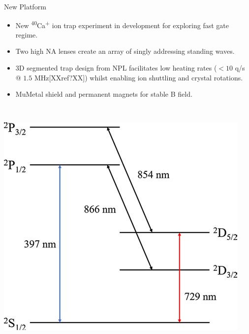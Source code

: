 \documentclass[final]{beamer}
\begin{document}
\begin{frame}{}
\begin{center}
\begin{columns}[t]
\begin{column}{0.49\textwidth}
    \begin{alertblock}{New Platform}
      \begin{minipage}{0.58\textwidth}
      \begin{itemize}
      \item New \textsuperscript{40}Ca\textsuperscript{+} ion trap experiment in development for exploring fast
        gate regime.
      \item Two high NA lenses create an array of singly
        addressing standing waves.
      \item 3D segmented trap design from NPL facilitates low heating
        rates ($<10$ q/s @ $1.5$ MHz[XXref?XX]) whilst enabling ion shuttling and crystal rotations.
      \item MuMetal shield and permanent magnets for stable B field.
      \end{itemize}
      \end{minipage}
      ~~
      \begin{minipage}{0.35\textwidth}
      \includegraphics[width=0.94\textwidth]{./figs/ca_struct_tmp.jpeg}
      \end{minipage}


\end{alertblock}
\end{column}
\end{columns}
\end{center}
\end{frame}
\end{document}
